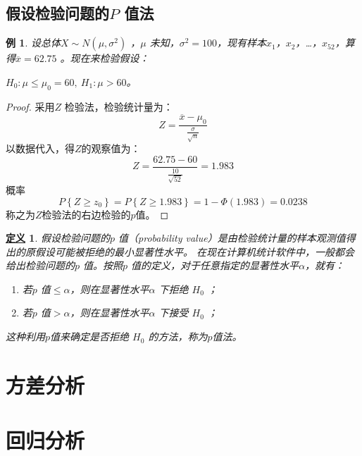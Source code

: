 \documentclass[11pt]{book}
\newtheorem{exercise}{\hspace{2em}\textbf{例}}[section]
\newcounter{#2}
\newcounter{#2}[#1]
\numberwithin{#2}{#1}
\newtheorem{newdef}{\textbf{\uline{定义}}}[chapter]
\begin{document}
	
	\section{假设检验问题的$ P $ 值法}
	\begin{exercise}
	设总体$ X \sim N(\mu ,\sigma ^{2})$ ，$ \mu $ 未知，$ \sigma ^{2}=100 $，现有样本$ x_1 $，$ x_2 $，\dots ，$ x_{52} $，算得$ \overline{x} = 62.75$ 。现在来检验假设：
	\begin{center}
		$ H_0:\mu \le \mu _0=60,\ H_1 :\mu >60 $。
	\end{center}
\end{exercise}

\begin{proof}
	采用$ Z $ 检验法，检验统计量为：
	\begin{equation*}
		Z=\frac{\overline{x} - \mu_0}{\frac{\sigma}{\sqrt{n}}}
	\end{equation*}
	以数据代入，得$Z$的观察值为：
	\begin{equation*}
		Z=\frac{62.75 - 60}{\frac{10}{\sqrt{52}}}=1.983
	\end{equation*}
	概率
	\begin{equation*}
		P\left\lbrace Z \ge z_0\right\rbrace =P\left\lbrace Z\ge1.983\right\rbrace =1-\Phi(1.983)=0.0238
	\end{equation*}
	称之为$Z$检验法的右边检验的$p$值。
\end{proof}
\begin{newdef}
	假设检验问题的$ p $ 值（probability value）是由检验统计量的样本观测值得出的原假设可能被拒绝的最小显著性水平。
	在现在计算机统计软件中，一般都会给出检验问题的$ p $ 值。按照$ p $ 值的定义，对于任意指定的显著性水平$ \alpha $，就有：
	
	\begin{enumerate}
		\item 若$ p $ 值$ \le \alpha $，则在显著性水平$ \alpha $ 下拒绝 $ H_0 $ ；
		\item 若$ p $ 值$ > \alpha $，则在显著性水平$ \alpha $ 下接受 $ H_0 $ ；
	\end{enumerate}
这种利用$p$值来确定是否拒绝 $ H_0 $ 的方法，称为$p$值法。
\end{newdef}


	\chapter{方差分析}
	\chapter{回归分析}
	
\printindex
	
\end{document}

